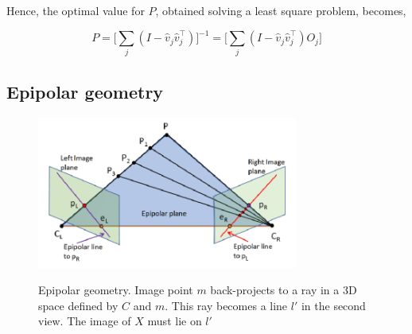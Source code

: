 Hence, the optimal value for $P$, obtained solving a least square problem, becomes,

\begin{equation}\label{eqn:solP}
	P = \Big[ \sum_j (I - \hat{v}_j \hat{v}_j^\top ) \Big]^{-1} = \Big[ \sum_j (I - \hat{v}_j \hat{v}_j^\top )O_j \Big]
\end{equation}

\subsection{Epipolar geometry}
\label{subsec:epipolargeom}

\begin{figure}[t]
	\begin{center}
		{\includegraphics[width=.8\textwidth, height=5cm, keepaspectratio]{images/epipolar-geometry-2}}
\caption{Epipolar geometry. Image point $m$ back-projects to a ray in a 3D space defined by $C$ and $m$. This ray becomes a line $l'$ in the second view. The image of $X$ must lie on $l'$}
\label{fig:epipolargeom-2}
	\end{center}
\end{figure}

